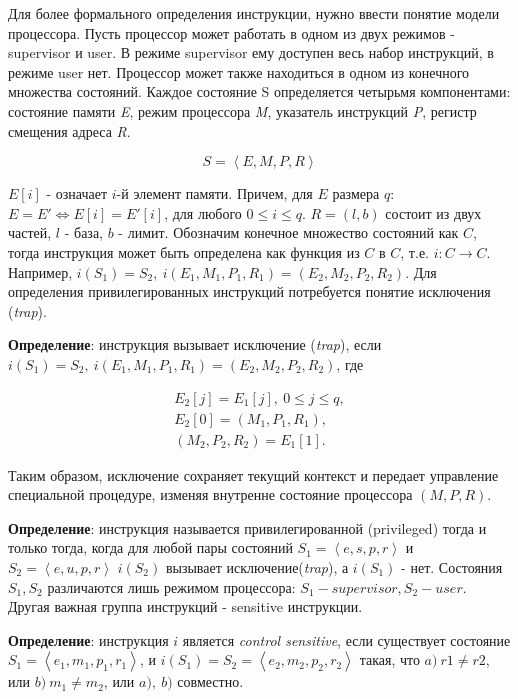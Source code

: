 Для более формального определения инструкции, нужно ввести понятие модели процессора. Пусть процессор может работать в одном из двух режимов - supervisor и user. В режиме supervisor ему доступен весь набор инструкций, в режиме user нет. Процессор может также находиться в одном из конечного множества состояний. Каждое состояние S определяется четырьмя компонентами: состояние памяти \textit{E}, режим процессора \textit{M}, указатель инструкций \textit{P}, регистр смещения адреса \textit{R}\cite{bib:popek_goldberg}.

\begin{equation}\label{eq:machine_state}
S=\left<E, M, P, R\right>
\end{equation}

$E[i]$ - означает $i$-й элемент памяти. Причем, для $E$ размера $q$: $E=E' \Leftrightarrow E[i] = E'[i]$, для любого $0 \le i  \le q$. $R=(l, b)$ состоит из двух частей, $l$ - база, $b$ - лимит. Обозначим конечное множество состояний как $C$, тогда инструкция может быть определена как функция из $C$ в $C$, т.е.  $i:C\to C$. Например, $i(S_1) = S_2,\ i(E_1, M_1, P_1, R_1) = (E_2, M_2, P_2, R_2)$. Для определения привилегированных инструкций потребуется понятие исключения (\textit{trap}).

\textbf{Определение}: инструкция вызывает исключение (\textit{trap}), если $i(S_1) = S_2,\ i(E_1, M_1, P_1, R_1) = (E_2, M_2, P_2, R_2)$, где

\begin{align*}\label{eq:trap}
E_2[j] = E_1[j],\ 0 \le j \le q,\\
E_2[0] = (M_1, P_1, R_1),\\
(M_2, P_2, R_2) = E_1[1].
\end{align*}

Таким образом, исключение сохраняет текущий контекст и передает управление специальной процедуре, изменяя внутренне состояние процессора $(M, P, R)$. 

\textbf{Определение}: инструкция называется привилегированной (privileged) тогда и только тогда, когда для любой пары состояний $S_1=\left<e, s, p, r\right>$ и $S_2=\left<e, u, p, r\right>$ $i(S_2)$ вызывает исключение(\textit{trap}), а $i(S_1)$ - нет. Состояния $S_1, S_2$ различаются лишь режимом процессора: $S_1 - supervisor, S_2 - user$. Другая важная группа инструкций - sensitive инструкции.

\textbf{Определение}: инструкция $i$ является \textit{control sensitive}, если существует состояние $S_1=\left<e_1, m_1, p_1, r_1\right>$, и $i(S_1) = S_2 = \left<e_2, m_2, p_2, r_2\right>$ такая, что $a)\ r1 \ne r2$, или $b)\ m_1 \ne m_2$, или $a),\ b)$ совместно.

